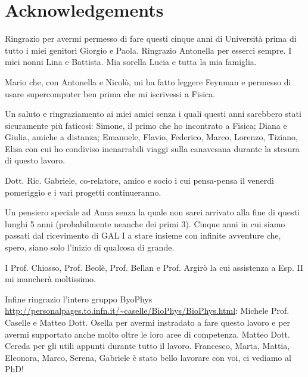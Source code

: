 \chapter*{Acknowledgements}
Ringrazio per avermi permesso di fare questi cinque anni di Università prima di tutto i miei genitori Giorgio e Paola.
Ringrazio Antonella per esserci sempre. I miei nonni Lina e Battista. Mia sorella Lucia e tutta la mia famiglia.

Mario che, con Antonella e Nicolò, mi ha fatto leggere Feynman e permesso di usare supercomputer ben prima che mi iscrivessi a Fisica.

Un saluto e ringraziamento ai miei amici senza i quali questi anni sarebbero stati sicuramente più faticosi: Simone, il primo che ho incontrato a Fisica; Diana e Giulia, amiche a distanza; Emanuele, Flavio, Federico, Marco, Lorenzo, Tiziano, Elisa con cui ho condiviso inenarrabili viaggi sulla canavesana durante la stesura di questo lavoro.

Dott. Ric. Gabriele, co-relatore, amico e socio i cui pensa-pensa il venerdì pomeriggio e i vari progetti continueranno.

Un pensiero speciale ad Anna senza la quale non sarei arrivato alla fine di questi lunghi 5 anni (probabilmente neanche dei primi 3). Cinque anni in cui siamo passati dal ricevimento di GAL I a stare insieme con infinite avventure che, spero, siano solo l'inizio di qualcosa di grande.

I Prof. Chiosso, Prof. Beolè, Prof. Bellan e Prof. Argirò la cui assistenza a Esp. II mi mancherà moltissimo.

Infine ringrazio l'intero gruppo ByoPhys \\ \url{http://personalpages.to.infn.it/~caselle/BioPhys/BioPhys.html}: Michele Prof. Caselle e Matteo Dott. Osella per avermi instradato a fare questo lavoro e per avermi supportato anche molto oltre le loro aree di competenza. Matteo Dott. Cereda per gli utili appunti durante tutto il lavoro.
Francesco, Marta, Mattia, Eleonora, Marco, Serena, Gabriele è stato bello lavorare con voi, ci vediamo al PhD!
